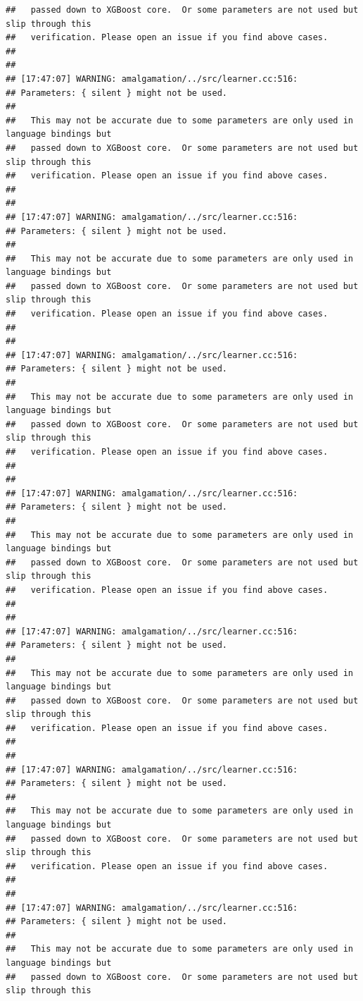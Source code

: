 \documentclass[AMS,STIX2COL]{WileyNJD-v2}\usepackage[]{graphicx}\usepackage[]{color}
\makeatletter
\newenvironment{kframe}{%
 \def\at@end@of@kframe{}%
 \ifinner\ifhmode%
  \def\at@end@of@kframe{\end{minipage}}%
  \begin{minipage}{\columnwidth}%
 \fi\fi%
 \def\FrameCommand##1{\hskip\@totalleftmargin \hskip-\fboxsep
 \colorbox{shadecolor}{##1}\hskip-\fboxsep
     \hskip-\linewidth \hskip-\@totalleftmargin \hskip\columnwidth}%
 \MakeFramed {\advance\hsize-\width
   \@totalleftmargin\z@ \linewidth\hsize
   \@setminipage}}%
 {\par\unskip\endMakeFramed%
 \at@end@of@kframe}
\newenvironment{knitrout}{}{} %
\makeatother
\begin{document}
\begin{knitrout}
\begin{kframe}
\begin{verbatim}
##   passed down to XGBoost core.  Or some parameters are not used but slip through this
##   verification. Please open an issue if you find above cases.
## 
## 
## [17:47:07] WARNING: amalgamation/../src/learner.cc:516: 
## Parameters: { silent } might not be used.
## 
##   This may not be accurate due to some parameters are only used in language bindings but
##   passed down to XGBoost core.  Or some parameters are not used but slip through this
##   verification. Please open an issue if you find above cases.
## 
## 
## [17:47:07] WARNING: amalgamation/../src/learner.cc:516: 
## Parameters: { silent } might not be used.
## 
##   This may not be accurate due to some parameters are only used in language bindings but
##   passed down to XGBoost core.  Or some parameters are not used but slip through this
##   verification. Please open an issue if you find above cases.
## 
## 
## [17:47:07] WARNING: amalgamation/../src/learner.cc:516: 
## Parameters: { silent } might not be used.
## 
##   This may not be accurate due to some parameters are only used in language bindings but
##   passed down to XGBoost core.  Or some parameters are not used but slip through this
##   verification. Please open an issue if you find above cases.
## 
## 
## [17:47:07] WARNING: amalgamation/../src/learner.cc:516: 
## Parameters: { silent } might not be used.
## 
##   This may not be accurate due to some parameters are only used in language bindings but
##   passed down to XGBoost core.  Or some parameters are not used but slip through this
##   verification. Please open an issue if you find above cases.
## 
## 
## [17:47:07] WARNING: amalgamation/../src/learner.cc:516: 
## Parameters: { silent } might not be used.
## 
##   This may not be accurate due to some parameters are only used in language bindings but
##   passed down to XGBoost core.  Or some parameters are not used but slip through this
##   verification. Please open an issue if you find above cases.
## 
## 
## [17:47:07] WARNING: amalgamation/../src/learner.cc:516: 
## Parameters: { silent } might not be used.
## 
##   This may not be accurate due to some parameters are only used in language bindings but
##   passed down to XGBoost core.  Or some parameters are not used but slip through this
##   verification. Please open an issue if you find above cases.
## 
## 
## [17:47:07] WARNING: amalgamation/../src/learner.cc:516: 
## Parameters: { silent } might not be used.
## 
##   This may not be accurate due to some parameters are only used in language bindings but
##   passed down to XGBoost core.  Or some parameters are not used but slip through this

\end{verbatim}
\end{kframe}
\end{knitrout}
\end{document}
